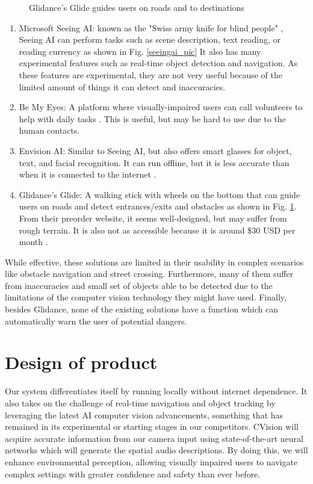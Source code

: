 \documentclass[12pt,a4paper]{article}
\begin{document}
\begin{figure}[ht!]
\begin{minipage}[t]{0.3\textwidth}
        \caption{Glidance's Glide guides users on roads and to destinations \cite{glidance}}
        \label{glidance_pic}
    \end{minipage}
\end{figure}

\begin{enumerate}
    \item Microsoft Seeing AI: known as the "Swiss army knife for blind people" \cite{microsoft2024}, Seeing AI can perform tasks such as scene description, text reading, or reading currency as shown in Fig. \ref{seeingai_pic}
    It also has many experimental features such as real-time object detection and navigation. As these features are experimental, they are not very useful because of the limited amount of things it can detect and inaccuracies.
    \item Be My Eyes: A platform where visually-impaired users can call volunteers to help with daily tasks \cite{bemyeyes}. This is useful, but may be hard to use due to the human contacts.
    \item Envision AI: Similar to Seeing AI, but also offers smart glasses for object, text, and facial recognition. It can run offline, but it is less accurate than when it is connected to the internet \cite{envision}.
    \item Glidance's Glide: A walking stick with wheels on the bottom that can guide users on roads and detect entrances/exits and obstacles as shown in Fig. \ref{glidance_pic}. From their preorder website, it seems well-designed, but may suffer from rough terrain. It is also not as accessible because it is around \$30 USD per month \cite{glidance}. 
\end{enumerate}
While effective, these solutions are limited in their usability in complex scenarios like obstacle navigation and street crossing.
Furthermore, many of them suffer from inaccuracies and small set of objects able to be detected due to the limitations of the computer vision technology they might have used.
Finally, besides Glidance, none of the existing solutions have a function which can automatically warn the user of potential dangers.

\newpage
\section{Design of product}
Our system differentiates itself by running locally without internet dependence.
It also takes on the challenge of real-time navigation and object tracking by leveraging the latest AI computer vision advancements, something that has remained in its experimental or starting stages in our competitors.
CVision will acquire accurate information from our camera input using state-of-the-art neural networks which will generate the spatial audio descriptions.
By doing this, we will enhance environmental perception, allowing visually impaired users to navigate complex settings with greater confidence and safety than ever before.
\end{document}
